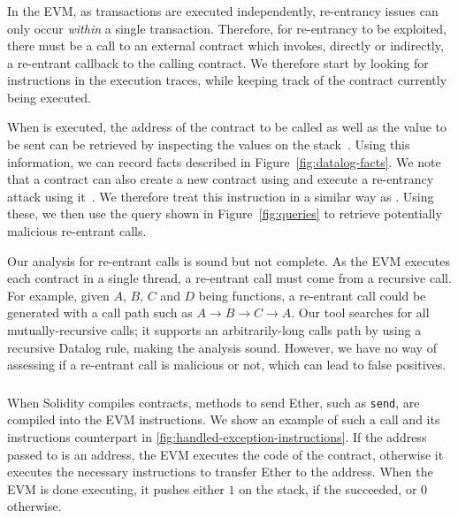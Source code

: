 


\subsubsection{\reentrancy}
In the EVM, as transactions are executed independently, re-entrancy issues can only occur \emph{within} a single transaction. Therefore, for re-entrancy to be exploited, there must be a call to an external contract which invokes, directly or indirectly, a re-entrant callback to the calling contract. We therefore start by looking for  instructions in the execution traces, while keeping track of the contract currently being executed.

When  is executed, the address of the contract to be called as well as the value to be sent can be retrieved by inspecting the values on the stack~\cite{wood2014ethereum}. Using this information, we can record  facts described in Figure~\ref{fig:datalog-facts}.
We note that a contract can also create a new contract using  and execute a re-entrancy attack using it~\cite{Rodler2019}. We therefore treat this instruction in a similar way as .
Using these, we then use the query shown in Figure~\ref{fig:queries} to retrieve potentially malicious re-entrant calls.

\correctness Our analysis for re-entrant calls is sound but not complete. As the EVM executes each contract in a single thread, a re-entrant call must come from a recursive call. For example, given $A$, $B$, $C$ and $D$ being functions, a re-entrant call could be generated with a call path such as $A\rightarrow B \rightarrow C\rightarrow A$. Our tool searches for all mutually-recursive calls; it supports an arbitrarily-long calls path by using a recursive Datalog rule, making the analysis sound. However, we have no way of assessing if a re-entrant call is malicious or not, which can lead to false positives.

\subsubsection{\unhandledexceptions}
%
When Solidity compiles contracts, methods to send Ether, such as \lstinline{send}, are compiled into the EVM  instructions. We show an example of such a call and its instructions counterpart in \autoref{fig:handled-exception-instructions}. If the address passed to  is an address, the EVM executes the code of the contract, otherwise it executes the necessary instructions to transfer Ether to the address. When the EVM is done executing, it pushes either $1$ on the stack, if the  succeeded, or $0$ otherwise. 

